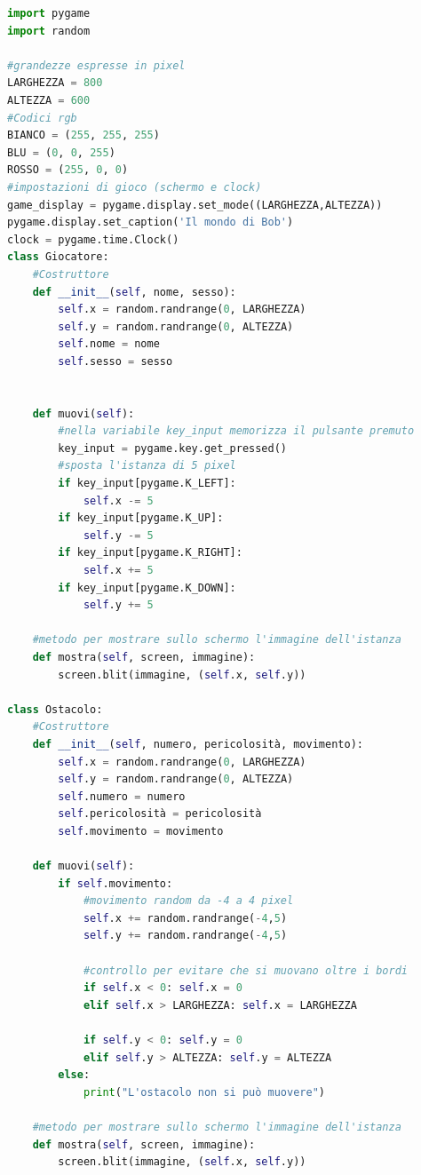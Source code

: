 \documentclass[12pt,a4paper]{article}
\begin{document}
\begin{lstlisting}[language=Python, caption=Codice videogioco "Il mondo di Bob" della seconda lezione]
import pygame
import random

#grandezze espresse in pixel
LARGHEZZA = 800
ALTEZZA = 600
#Codici rgb
BIANCO = (255, 255, 255)
BLU = (0, 0, 255)
ROSSO = (255, 0, 0)
#impostazioni di gioco (schermo e clock)
game_display = pygame.display.set_mode((LARGHEZZA,ALTEZZA))
pygame.display.set_caption('Il mondo di Bob')
clock = pygame.time.Clock()
class Giocatore:
    #Costruttore
    def __init__(self, nome, sesso):
        self.x = random.randrange(0, LARGHEZZA)
        self.y = random.randrange(0, ALTEZZA)
        self.nome = nome
        self.sesso = sesso


    def muovi(self):
        #nella variabile key_input memorizza il pulsante premuto
        key_input = pygame.key.get_pressed()  
        #sposta l'istanza di 5 pixel
        if key_input[pygame.K_LEFT]:
            self.x -= 5
        if key_input[pygame.K_UP]:
            self.y -= 5
        if key_input[pygame.K_RIGHT]:
            self.x += 5
        if key_input[pygame.K_DOWN]:
            self.y += 5

    #metodo per mostrare sullo schermo l'immagine dell'istanza
    def mostra(self, screen, immagine):
        screen.blit(immagine, (self.x, self.y))

class Ostacolo:
    #Costruttore
    def __init__(self, numero, pericolosità, movimento):
        self.x = random.randrange(0, LARGHEZZA)
        self.y = random.randrange(0, ALTEZZA)
        self.numero = numero
        self.pericolosità = pericolosità
        self.movimento = movimento
    
    def muovi(self):
        if self.movimento:
            #movimento random da -4 a 4 pixel
            self.x += random.randrange(-4,5)
            self.y += random.randrange(-4,5)

            #controllo per evitare che si muovano oltre i bordi
            if self.x < 0: self.x = 0
            elif self.x > LARGHEZZA: self.x = LARGHEZZA
        
            if self.y < 0: self.y = 0
            elif self.y > ALTEZZA: self.y = ALTEZZA
        else:
            print("L'ostacolo non si può muovere")
    
    #metodo per mostrare sullo schermo l'immagine dell'istanza
    def mostra(self, screen, immagine):
        screen.blit(immagine, (self.x, self.y))



\end{lstlisting}
\end{document}
